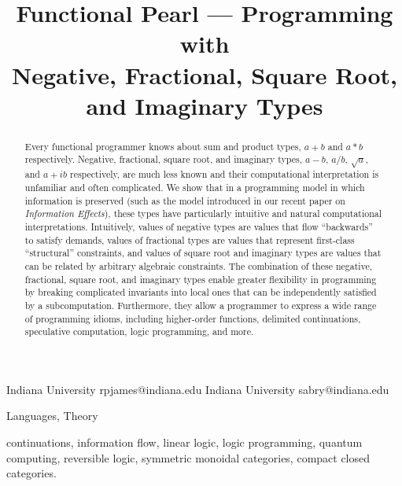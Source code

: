 \documentclass[preprint]{sigplanconf}
\begin{document}
\CopyrightYear{}
\copyrightdata{}
\titlebanner{}
\preprintfooter{}

\title{Functional Pearl --- Programming with \\ 
  Negative, Fractional, Square Root, and Imaginary Types} 
           {Indiana University}
           {rpjames@indiana.edu}
           {Indiana University}
           {sabry@indiana.edu}
\maketitle

\begin{abstract}
  Every functional programmer knows about sum and product types, $a+b$ and
  $a*b$ respectively. Negative, fractional, square root, and imaginary types,
  $a-b$, $a/b$, $\sqrt{a}$, and $a+ib$ respectively, are much less known and
  their computational interpretation is unfamiliar and often complicated. We
  show that in a programming model in which information is preserved (such as
  the model introduced in our recent paper on \emph{Information Effects}),
  these types have particularly intuitive and natural computational
  interpretations. Intuitively, values of negative types are values that flow
  ``backwards'' to satisfy demands, values of fractional types are values
  that represent first-class ``structural'' constraints, and values of square
  root and imaginary types are values that can be related by arbitrary
  algebraic constraints. The combination of these negative, fractional,
  square root, and imaginary types enable greater flexibility in programming
  by breaking complicated invariants into local ones that can be
  independently satisfied by a subcomputation. Furthermore, they allow a
  programmer to express a wide range of programming idioms, including
  higher-order functions, delimited continuations, speculative computation,
  logic programming, and more.
\end{abstract}


\terms
Languages, Theory

\keywords continuations, information flow, linear logic, logic programming,
quantum computing, reversible logic, symmetric monoidal categories, compact
closed categories.
\end{document}
